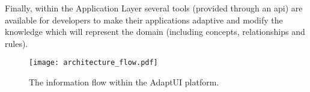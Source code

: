 Finally, within the Application Layer several tools (provided through an \ac{api})
are available for developers to make their applications adaptive and modify the
knowledge which will represent the domain (including concepts, relationships and
rules).

\begin{figure}
\centering
\texttt{[image: architecture\_flow.pdf]}
\caption{The information flow within the AdaptUI platform.}
\label{fig:architecture_flow}
\end{figure}